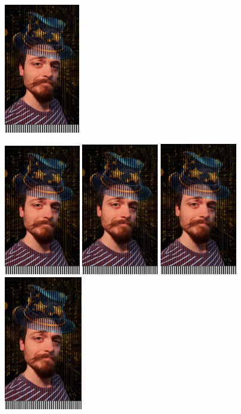 \documentclass{article}
\begin{document}
\includegraphics[width=1.30in]{mag_gi_interlaced_horizontal.png}

\includegraphics[width=1.31in]{mag_gi_interlaced_horizontal.png}
\includegraphics[width=1.32in]{mag_gi_interlaced_horizontal.png}
\includegraphics[width=1.33in]{mag_gi_interlaced_horizontal.png}
\includegraphics[width=1.34in]{mag_gi_interlaced_horizontal.png}
\end{document}
